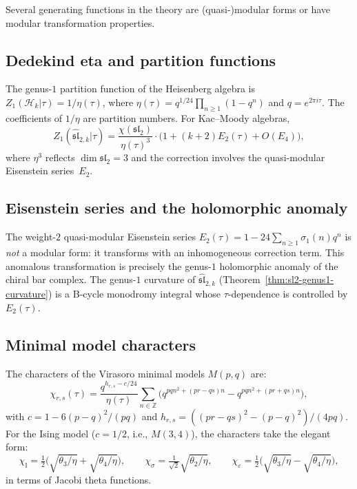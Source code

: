 Several generating functions in the theory are (quasi-)modular forms or have modular transformation properties.

\subsection{Dedekind eta and partition functions}

The genus-$1$ partition function of the Heisenberg algebra is $Z_1(\mathcal{H}_k | \tau) = 1/\eta(\tau)$, where $\eta(\tau) = q^{1/24}\prod_{n \geq 1}(1-q^n)$ and $q = e^{2\pi i \tau}$.  The coefficients of $1/\eta$ are partition numbers.  For Kac--Moody algebras,
\[
Z_1(\widehat{\mathfrak{sl}}_{2,k} | \tau)
= \frac{\chi(\mathfrak{sl}_2)}{\eta(\tau)^3}
\cdot \bigl(1 + (k+2) E_2(\tau) + O(E_4)\bigr),
\]
where $\eta^3$ reflects $\dim\mathfrak{sl}_2 = 3$ and the correction involves the quasi-modular Eisenstein series~$E_2$.

\subsection{Eisenstein series and the holomorphic anomaly}

The weight-$2$ quasi-modular Eisenstein series $E_2(\tau) = 1 - 24\sum_{n \geq 1}\sigma_1(n)q^n$ is \emph{not} a modular form: it transforms with an inhomogeneous correction term.  This anomalous transformation is precisely the genus-$1$ holomorphic anomaly of the chiral bar complex.  The genus-$1$ curvature of $\widehat{\mathfrak{sl}}_{2,k}$ (Theorem~\ref{thm:sl2-genus1-curvature}) is a B-cycle monodromy integral whose $\tau$-dependence is controlled by $E_2(\tau)$.

\subsection{Minimal model characters}

The characters of the Virasoro minimal models $M(p,q)$ are:
\[
\chi_{r,s}(\tau)
= \frac{q^{h_{r,s} - c/24}}{\eta(\tau)}
\sum_{n \in \mathbb{Z}}
\bigl(q^{pqn^2 + (pr-qs)n} - q^{pqn^2 + (pr+qs)n}\bigr),
\]
with $c = 1 - 6(p-q)^2/(pq)$ and $h_{r,s} = ((pr-qs)^2 - (p-q)^2)/(4pq)$.  For the Ising model ($c = 1/2$, i.e., $M(3,4)$), the characters take the elegant form:
\[
\chi_{\mathbb{I}} = \tfrac{1}{2}\bigl(\sqrt{\theta_3/\eta} + \sqrt{\theta_4/\eta}\bigr),
\qquad
\chi_\sigma = \tfrac{1}{\sqrt{2}}\sqrt{\theta_2/\eta},
\qquad
\chi_\varepsilon = \tfrac{1}{2}\bigl(\sqrt{\theta_3/\eta} - \sqrt{\theta_4/\eta}\bigr),
\]
in terms of Jacobi theta functions.

